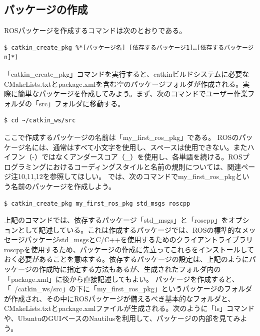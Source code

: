 \subsection{パッケージの作成}
ROSパッケージを作成するコマンドは次のとおりである。

\begin{lstlisting}[language=ROS]
$ catkin_create_pkg %*[パッケージ名] [依存するパッケージ1]…[依存するパッケージn]*)
\end{lstlisting}



「catkin\_create\_pkg」コマンドを実行すると、catkinビルドシステムに必要なCMakeLists.txtとpackage.xmlを含む空のパッケージフォルダが作成される。実際に簡単なパッケージを作成してみよう。まず、次のコマンドでユーザー作業フォルダの「src」フォルダに移動する。

\begin{lstlisting}[language=ROS]
$ cd ~/catkin_ws/src
\end{lstlisting}

ここで作成するパッケージの名前は「my\_first\_ros\_pkg」である。 ROSのパッケージ名には、通常はすべて小文字を使用し、スペースは使用できない。またハイフン（-）ではなくアンダースコア（\_）を使用し、各単語を続ける。ROSプログラミングにおけるコーディングスタイルと名前の規則については、関連ページ注10,11,12を参照してほしい。
では、次のコマンドでmy\_first\_ros\_pkgという名前のパッケージを作成しよう。

\begin{lstlisting}[language=ROS]
$ catkin_create_pkg my_first_ros_pkg std_msgs roscpp
\end{lstlisting}

上記のコマンドでは、依存するパッケージ「std\_msgs」と「roscpp」をオプションとして記述している。これは作成するパッケージでは、ROSの標準的なメッセージパッケージstd\_msgsとC/C++を使用するためのクライアントライブラリroscppを使用するため、パッケージの作成に先立ってこれらをインストールしておく必要があることを意味する。依存するパッケージの設定は、上記のようにパッケージの作成時に指定する方法もあるが、生成されたフォルダ内の「package.xml」に後から直接記述してもよい。
パッケージを作成すると、「~/catkin\_ws/src」の下に「my\_first\_ros\_pkg」というパッケージのフォルダが作成され、その中にROSパッケージが備えるべき基本的なフォルダと、CMakeLists.txtとpackage.xmlファイルが生成される。次のように「ls」コマンドや、UbuntuのGUIベースのNautilusを利用して、パッケージの内部を見てみよう。

